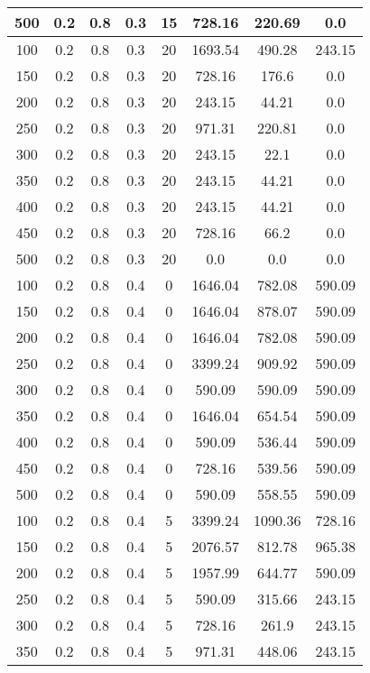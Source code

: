 \documentclass[a4paper, 12pt]{extreport}
\begin{document}
\begin{itemize}
\begin{longtable}{|c|c|c|c|c|c|c|c|}
			500 & 0.2 & 0.8 & 0.3 & 15 & 728.16 & 220.69 & 0.0 \\\hline
			100 & 0.2 & 0.8 & 0.3 & 20 & 1693.54 & 490.28 & 243.15 \\\hline
			150 & 0.2 & 0.8 & 0.3 & 20 & 728.16 & 176.6 & 0.0 \\\hline
			200 & 0.2 & 0.8 & 0.3 & 20 & 243.15 & 44.21 & 0.0 \\\hline
			250 & 0.2 & 0.8 & 0.3 & 20 & 971.31 & 220.81 & 0.0 \\\hline
			300 & 0.2 & 0.8 & 0.3 & 20 & 243.15 & 22.1 & 0.0 \\\hline
			350 & 0.2 & 0.8 & 0.3 & 20 & 243.15 & 44.21 & 0.0 \\\hline
			400 & 0.2 & 0.8 & 0.3 & 20 & 243.15 & 44.21 & 0.0 \\\hline
			450 & 0.2 & 0.8 & 0.3 & 20 & 728.16 & 66.2 & 0.0 \\\hline
			500 & 0.2 & 0.8 & 0.3 & 20 & 0.0 & 0.0 & 0.0 \\\hline
			100 & 0.2 & 0.8 & 0.4 & 0 & 1646.04 & 782.08 & 590.09 \\\hline
			150 & 0.2 & 0.8 & 0.4 & 0 & 1646.04 & 878.07 & 590.09 \\\hline
			200 & 0.2 & 0.8 & 0.4 & 0 & 1646.04 & 782.08 & 590.09 \\\hline
			250 & 0.2 & 0.8 & 0.4 & 0 & 3399.24 & 909.92 & 590.09 \\\hline
			300 & 0.2 & 0.8 & 0.4 & 0 & 590.09 & 590.09 & 590.09 \\\hline
			350 & 0.2 & 0.8 & 0.4 & 0 & 1646.04 & 654.54 & 590.09 \\\hline
			400 & 0.2 & 0.8 & 0.4 & 0 & 590.09 & 536.44 & 590.09 \\\hline
			450 & 0.2 & 0.8 & 0.4 & 0 & 728.16 & 539.56 & 590.09 \\\hline
			500 & 0.2 & 0.8 & 0.4 & 0 & 590.09 & 558.55 & 590.09 \\\hline
			100 & 0.2 & 0.8 & 0.4 & 5 & 3399.24 & 1090.36 & 728.16 \\\hline
			150 & 0.2 & 0.8 & 0.4 & 5 & 2076.57 & 812.78 & 965.38 \\\hline
			200 & 0.2 & 0.8 & 0.4 & 5 & 1957.99 & 644.77 & 590.09 \\\hline
			250 & 0.2 & 0.8 & 0.4 & 5 & 590.09 & 315.66 & 243.15 \\\hline
			300 & 0.2 & 0.8 & 0.4 & 5 & 728.16 & 261.9 & 243.15 \\\hline
			350 & 0.2 & 0.8 & 0.4 & 5 & 971.31 & 448.06 & 243.15 \\\hline

\end{longtable}
\end{itemize}
\end{document}
